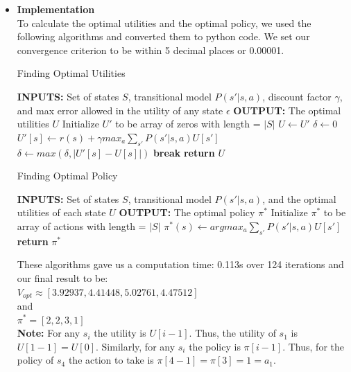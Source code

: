 \documentclass{article}
\begin{document}
\begin{itemize}
\begin{center}
            \end{center}
        \clearpage
        \item \textbf{Implementation}\\
            To calculate the optimal utilities and the optimal policy, we used the following algorithms
            and converted them to python code. We set our convergence criterion to be within
            5 decimal places or 0.00001.
            \begin{algorithm}
            \caption{Finding Optimal Utilities}
            \begin{algorithmic}
                \STATE \textbf{INPUTS:} Set of states $S$, transitional model $P(s'|s,a)$,
                    discount factor $\gamma$, and max error allowed in the utility of any state $\epsilon$
                \STATE \textbf{OUTPUT:} The optimal utilities $U$
                \STATE{}
                \STATE Initialize $U'$ to be array of zeros with length = $|S|$
                    \STATE $U \leftarrow U'$
                    \STATE $\delta \leftarrow 0$
                        \STATE $U'[s] \leftarrow r(s) + \gamma max_a\sum_{s'}P(s'|s, a)U[s']$
                        \STATE $\delta \leftarrow max(\delta, |U'[s] - U[s]|)$
                    \ENDFOR
                        \STATE \textbf{break}
                    \ENDIF
                \ENDWHILE
                \STATE \textbf{return} $U$
            \end{algorithmic}
            \end{algorithm}
            
            \begin{algorithm}
            \caption{Finding Optimal Policy}
            \begin{algorithmic}
                \STATE \textbf{INPUTS:} Set of states $S$, transitional model $P(s'|s,a)$, and the
                    optimal utilities of each state $U$
                \STATE \textbf{OUTPUT:} The optimal policy $\pi^*$
                \STATE{}
                \STATE Initialize $\pi^*$ to be array of actions with length = $|S|$
                    \STATE $\pi^*(s) \leftarrow argmax_a\sum_{s'}P(s'|s, a)U[s']$
                \ENDFOR
                \STATE \textbf{return} $\pi^*$
            \end{algorithmic}
            \end{algorithm}
            These algorithms gave us a computation time: 0.113s over 124 iterations and our final result to be:\\
            $V_{opt} \approx [3.92937, 4.41448, 5.02761, 4.47512]$\\
            and\\
            $\pi^* = [2, 2, 3, 1]$\\
            \textbf{Note:} For any $s_i$ the utility is $U[i - 1]$. Thus,
                the utility of $s_1$ is $U[1 - 1] = U[0]$. Similarly, for any $s_i$ the 
                policy is $\pi[i - 1]$. Thus, for the policy of $s_4$ the action to take is
                $\pi[4 - 1] = \pi[3] = 1 = a_1$.
    \end{itemize}
\end{document}
